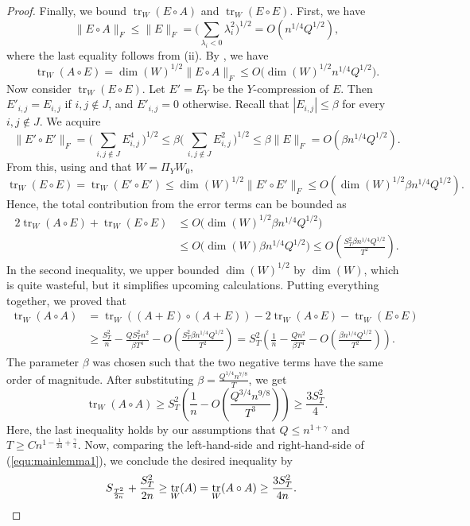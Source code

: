 \documentclass[11pt]{article}
\theoremstyle{plain}
\theoremstyle{definition}
\DeclareMathOperator{\trace}{tr}
\begin{document}
\begin{proof}
Finally, we bound $\trace_W(E\circ A)$ and $\trace_W(E\circ E)$. First, we have 
$$\|E\circ A\|_F\leq \|E\|_F=\bigg(\sum_{\lambda_i<0}\lambda_i^2\bigg)^{1/2}=O(n^{1/4}Q^{1/2}),$$
where the last equality follows from  (ii). 
By , we have
$$\trace_W(A\circ E)=\dim(W)^{1/2} \|E\circ A\|_F\leq O\big(\dim(W)^{1/2}n^{1/4}Q^{1/2}\big).$$
Now consider $\trace_W(E\circ E)$.
Let $E'=E_Y$ be the $Y$-compression of $E$.
Then $E'_{i,j}=E_{i,j}$ if $i,j\not\in J$, and $E'_{i,j}=0$ otherwise. 
Recall that $|E_{i,j}| \le \beta$ for every $i,j \notin J$. We acquire
\begin{equation} \nonumber
    \|E'\circ E'\|_F
    =\bigg(\,\sum_{i,j\not\in J} E_{i,j}^4\,\bigg)^{1/2}
    \leq \beta \bigg(\,\sum_{i,j\not\in J}E_{i,j}^2\,\bigg)^{1/2}
    \leq \beta \|E\|_F=O(\beta n^{1/4}Q^{1/2}).
\end{equation}
From this, using  and that $W=\Pi_{Y} W_0$,
$$\trace_W(E\circ E)=\trace_W(E'\circ E')
    \leq \dim(W)^{1/2}\|E'\circ E'\|_F
    \leq O(\dim(W)^{1/2}\beta n^{1/4}Q^{1/2}).$$
Hence, the total contribution from the error terms can be bounded as
\begin{align*}
    2\trace_W(A\circ E)+\trace_W(E\circ E)
    &\leq O\big(\dim(W)^{1/2}\beta n^{1/4}Q^{1/2} \big)\\
    &\leq  O\big(\dim(W)\beta n^{1/4}Q^{1/2} \big)
    \leq O\!\left(\frac{S_T^2\beta n^{1/4}Q^{1/2}}{T^2}\right).
\end{align*}
In  the second inequality, we upper bounded $\dim(W)^{1/2}$ by $\dim(W)$, which is quite wasteful, but it simplifies upcoming calculations. Putting everything together, we proved that 
\begin{align*}
\trace_W(A\circ A)&=\trace_W((A+E)\circ (A+E))-2\trace_W(A\circ E)-\trace_W(E\circ E)\\
&\geq \frac{S_T^2}{n}-\frac{QS_T^2n^2}{\beta T^4}-O\left(\frac{S_T^2\beta n^{1/4}Q^{1/2}}{T^2}\right)=S_T^2\left(\frac{1}{n}-\frac{Qn^2}{\beta T^4}-O\left(\frac{\beta n^{1/4}Q^{1/2}}{T^2}\right)\right).
\end{align*}
The parameter $\beta$ was chosen such that the two negative terms have the same order of magnitude. After substituting $\beta=\frac{Q^{1/4}n^{7/8}}{T}$, we get
$$\trace_W(A\circ A) \ge S_T^2\left(\frac{1}{n}-O\left(\frac{Q^{3/4}n^{9/8}}{T^3}\right)\right)\geq \frac{3S_T^2}{4}.$$
Here, the last inequality holds by our assumptions that $Q\leq n^{1+\gamma}$ and $T\geq Cn^{1-\frac{1}{24}+\frac{\gamma}{4}}$. 
Now, comparing the left-hand-side and right-hand-side of (\ref{equ:mainlemma1}), we conclude the desired inequality by 
\begin{align}
S_{\frac{T^2}{2n}} + \frac{S_T^2}{2n} &\ge \trace_W(A) = \trace_W(A\circ A)
\geq \frac{3S_T^2}{4n}. \qedhere
\end{align}
\end{proof}
\end{document}
